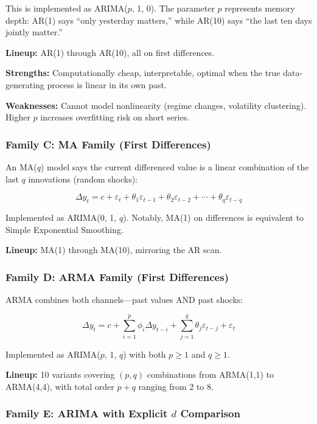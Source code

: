 This is implemented as ARIMA($p$, 1, 0). The parameter $p$ represents memory depth: AR(1) says ``only yesterday matters,'' while AR(10) says ``the last ten days jointly matter.''

\textbf{Lineup:} AR(1) through AR(10), all on first differences.

\textbf{Strengths:} Computationally cheap, interpretable, optimal when the true data-generating process is linear in its own past.

\textbf{Weaknesses:} Cannot model nonlinearity (regime changes, volatility clustering). Higher $p$ increases overfitting risk on short series.

\subsubsection{Family C: MA Family (First Differences)}

An MA($q$) model says the current differenced value is a linear combination of the last $q$ innovations (random shocks):

\begin{equation}
\Delta y_t = c + \varepsilon_t + \theta_1 \varepsilon_{t-1} + \theta_2 \varepsilon_{t-2} + \cdots + \theta_q \varepsilon_{t-q}
\end{equation}

Implemented as ARIMA(0, 1, $q$). Notably, MA(1) on differences is equivalent to Simple Exponential Smoothing.

\textbf{Lineup:} MA(1) through MA(10), mirroring the AR scan.

\subsubsection{Family D: ARMA Family (First Differences)}

ARMA combines both channels---past values AND past shocks:

\begin{equation}
\Delta y_t = c + \sum_{i=1}^{p} \phi_i \Delta y_{t-i} + \sum_{j=1}^{q} \theta_j \varepsilon_{t-j} + \varepsilon_t
\end{equation}

Implemented as ARIMA($p$, 1, $q$) with both $p \geq 1$ and $q \geq 1$.

\textbf{Lineup:} 10 variants covering $(p,q)$ combinations from ARMA(1,1) to ARMA(4,4), with total order $p+q$ ranging from 2 to 8.

\subsubsection{Family E: ARIMA with Explicit $d$ Comparison}

